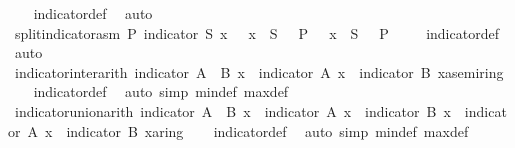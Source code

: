 \begin{isabellebody}
%
\isadelimproof
\ \ %
\endisadelimproof
%
\isatagproof
{}\isamarkupfalse%
\ indicator{\isacharunderscore}def\ \isamarkupfalse%
\ auto%
\endisatagproof
{\isafoldproof}%
%
\isadelimproof
\isanewline
%
\endisadelimproof
\isanewline
{}\isamarkupfalse%
\ split{\isacharunderscore}indicator{\isacharunderscore}asm{\isacharcolon}\ {\isachardoublequoteopen}P\ {\isacharparenleft}indicator\ S\ x{\isacharparenright}\ {\isasymlongleftrightarrow}\ {\isacharparenleft}{\isasymnot}\ {\isacharparenleft}x\ {\isasymin}\ S\ {\isasymand}\ {\isasymnot}\ P\ {}\ {\isasymor}\ x\ {\isasymnotin}\ S\ {\isasymand}\ {\isasymnot}\ P\ {}{\isacharparenright}{\isacharparenright}{\isachardoublequoteclose}\isanewline
%
\isadelimproof
\ \ %
\endisadelimproof
%
\isatagproof
{}\isamarkupfalse%
\ indicator{\isacharunderscore}def\ \isamarkupfalse%
\ auto%
\endisatagproof
{\isafoldproof}%
%
\isadelimproof
\isanewline
%
\endisadelimproof
\isanewline
{}\isamarkupfalse%
\ indicator{\isacharunderscore}inter{\isacharunderscore}arith{\isacharcolon}\ {\isachardoublequoteopen}indicator\ {\isacharparenleft}A\ {\isasyminter}\ B{\isacharparenright}\ x\ {\isacharequal}\ indicator\ A\ x\ {\isacharasterisk}\ {\isacharparenleft}indicator\ B\ x{\isacharcolon}{\isacharcolon}{\isacharprime}a{\isacharcolon}{\isacharcolon}semiring{\isacharunderscore}{}{\isacharparenright}{\isachardoublequoteclose}\isanewline
%
\isadelimproof
\ \ %
\endisadelimproof
%
\isatagproof
{}\isamarkupfalse%
\ indicator{\isacharunderscore}def\ \isamarkupfalse%
\ {\isacharparenleft}auto\ simp{\isacharcolon}\ min{\isacharunderscore}def\ max{\isacharunderscore}def{\isacharparenright}%
\endisatagproof
{\isafoldproof}%
%
\isadelimproof
\isanewline
%
\endisadelimproof
\isanewline
{}\isamarkupfalse%
\ indicator{\isacharunderscore}union{\isacharunderscore}arith{\isacharcolon}\ {\isachardoublequoteopen}indicator\ {\isacharparenleft}A\ {\isasymunion}\ B{\isacharparenright}\ x\ {\isacharequal}\ indicator\ A\ x\ {\isacharplus}\ indicator\ B\ x\ {\isacharminus}\ indicator\ A\ x\ {\isacharasterisk}\ {\isacharparenleft}indicator\ B\ x{\isacharcolon}{\isacharcolon}{\isacharprime}a{\isacharcolon}{\isacharcolon}ring{\isacharunderscore}{}{\isacharparenright}{\isachardoublequoteclose}\isanewline
%
\isadelimproof
\ \ %
\endisadelimproof
%
\isatagproof
{}\isamarkupfalse%
\ indicator{\isacharunderscore}def\ \isamarkupfalse%
\ {\isacharparenleft}auto\ simp{\isacharcolon}\ min{\isacharunderscore}def\ max{\isacharunderscore}def{\isacharparenright}%

\end{isabellebody}
